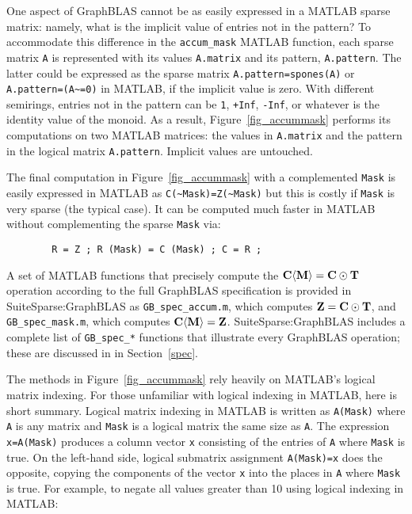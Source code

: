 \documentclass[12pt]{article}
\begin{document}
One aspect of GraphBLAS cannot be as easily expressed in a MATLAB sparse
matrix: namely, what is the implicit value of entries not in the pattern?  To
accommodate this difference in the \verb'accum_mask' MATLAB function, each
sparse matrix \verb'A' is represented with its values \verb'A.matrix' and its
pattern, \verb'A.pattern'.  The latter could be expressed as the sparse matrix
\verb'A.pattern=spones(A)' or \verb'A.pattern=(A~=0)' in MATLAB, if the
implicit value is zero.  With different semirings, entries not in the pattern
can be \verb'1', \verb'+Inf', \verb'-Inf', or whatever is the identity value of
the monoid.  As a result, Figure~\ref{fig_accummask} performs its computations
on two MATLAB matrices: the values in \verb'A.matrix' and the pattern in the
logical matrix \verb'A.pattern'.  Implicit values are untouched.

The final computation in Figure~\ref{fig_accummask}  with a complemented
\verb'Mask' is easily expressed in MATLAB as \verb'C(~Mask)=Z(~Mask)' but this
is costly if \verb'Mask' is very sparse (the typical case).  It can be computed
much faster in MATLAB without complementing the sparse \verb'Mask' via:

        {\footnotesize
        \begin{verbatim}
        R = Z ; R (Mask) = C (Mask) ; C = R ; \end{verbatim} }

A set of MATLAB functions that precisely compute the ${\bf C \langle M \rangle
= C \odot T}$ operation according to the full GraphBLAS specification is
provided in SuiteSparse:GraphBLAS as \verb'GB_spec_accum.m', which computes
${\bf Z=C\odot T}$, and \verb'GB_spec_mask.m', which computes ${\bf C \langle M
\rangle = Z}$.  SuiteSparse:GraphBLAS includes a complete list of
\verb'GB_spec_*' functions that illustrate every GraphBLAS operation;
these are discussed in in Section~\ref{spec}.

The methods in Figure~\ref{fig_accummask} rely heavily on MATLAB's logical
matrix indexing.  For those unfamiliar with logical indexing in MATLAB, here is
short summary.  Logical matrix indexing in MATLAB is written as \verb'A(Mask)'
where \verb'A' is any matrix and \verb'Mask' is a logical matrix the same size
as \verb'A'.  The expression \verb'x=A(Mask)' produces a column vector \verb'x'
consisting of the entries of \verb'A' where \verb'Mask' is true.  On the
left-hand side, logical submatrix assignment \verb'A(Mask)=x' does the
opposite, copying the components of the vector \verb'x' into the places in
\verb'A' where \verb'Mask' is true.  For example, to negate all values greater
than 10 using logical indexing in MATLAB:
\end{document}
